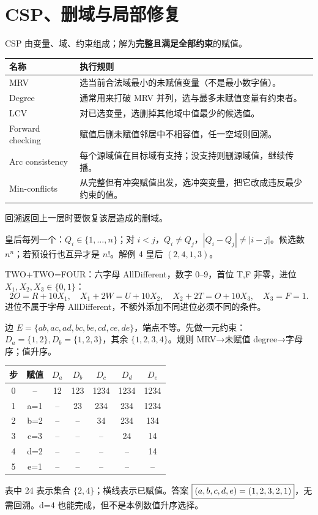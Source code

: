 \section{CSP、删域与局部修复}\label{sec:csp}
CSP 由变量、域、约束组成；解为\textbf{完整且满足全部约束}的赋值。
\par\noindent\begin{tabularx}{\textwidth}{lY}
\toprule 名称&执行规则\\\midrule
MRV&选当前合法域最小的未赋值变量（不是最小数字值）。\\
Degree&通常用来打破 MRV 并列，选与最多未赋值变量有约束者。\\
LCV&对已选变量，选删掉其他域中值最少的候选值。\\
Forward checking&赋值后删未赋值邻居中不相容值，任一空域则回溯。\\
Arc consistency&每个源域值在目标域有支持；没支持则删源域值，继续传播。\\
Min-conflicts&从完整但有冲突赋值出发，选冲突变量，把它改成违反最少约束的值。\\\bottomrule
\end{tabularx}\par
回溯返回上一层时要恢复该层造成的删域。

皇后每列一个：$Q_i\in\{1,\ldots,n\}$；对 $i<j$，$Q_i\ne Q_j$，$|Q_i-Q_j|\ne|i-j|$。候选数 $n^n$；若预设行也互异才是 $n!$。解例 4 皇后 $(2,4,1,3)$。

TWO+TWO=FOUR：六字母 AllDifferent，数字 0--9，首位 T,F 非零，进位 $X_1,X_2,X_3\in\{0,1\}$：
\[
2O=R+10X_1,\quad X_1+2W=U+10X_2,\quad
X_2+2T=O+10X_3,\quad X_3=F=1.
\]
进位不属于字母 AllDifferent，不额外添加不同进位必须不同的条件。

边 $E=\{ab,ac,ad,bc,be,cd,ce,de\}$，端点不等。先做一元约束：$D_a=\{1,2\},D_b=\{1,2,3\}$，其余 $\{1,2,3,4\}$。规则 MRV→未赋值 degree→字母序；值升序。
\begin{center}\small\begin{tabular}{c|c|ccccc}\toprule
步&赋值&$D_a$&$D_b$&$D_c$&$D_d$&$D_e$\\\midrule
0&--&12&123&1234&1234&1234\\
1&a=1&--&23&234&234&1234\\
2&b=2&--&--&34&234&134\\
3&c=3&--&--&--&24&14\\
4&d=2&--&--&--&--&14\\
5&e=1&--&--&--&--&--\\\bottomrule\end{tabular}\end{center}
表中 24 表示集合 $\{2,4\}$；横线表示已赋值。答案 $\boxed{(a,b,c,d,e)=(1,2,3,2,1)}$，无需回溯。d=4 也能完成，但不是本例数值升序选择。

